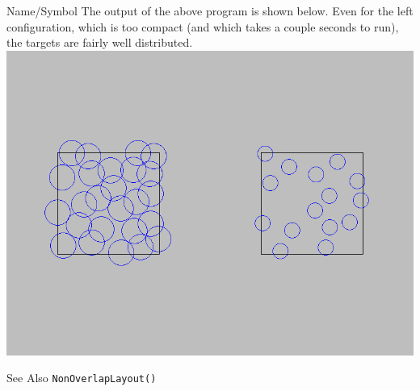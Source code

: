 \begin{desc}{Name/Symbol}
The output of the above program is shown below.  Even for the left configuration, which is too compact (and which takes a couple seconds to run), the targets are fairly well distributed.
\includegraphics[scale=.35]{images/LayoutGrid.png} 

\item[See Also]     
\verb+NonOverlapLayout()+
\end{desc}



